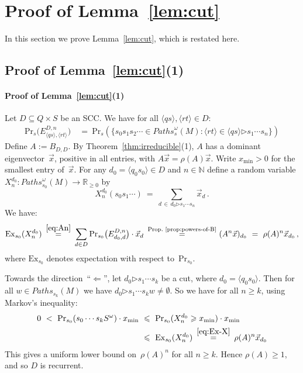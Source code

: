 \documentclass{elsarticle}
\def\<{\langle}
\def\>{\rangle}
\def\Nat{\mathbb{N}}
\def\Real{\mathbb{R}}
\def\Pr{\mathrm{Pr}}
\def\Paths{\mathit{Paths}}
\newcommand{\Ex}{\mathrm{Ex}}
\newcommand{\then}{\mathord{\triangleright}}
\begin{document}
\section{Proof of Lemma~\ref{lem:cut}} \label{sec:cut-proof}
In this section we prove Lemma~\ref{lem:cut}, which is restated here.

\lemcut*

\subsection{Proof of Lemma~\ref{lem:cut}(1)}
\paragraph{Proof of Lemma~\ref{lem:cut}(1)}
Let $D \subseteq Q \times S$ be an SCC.
We have for all $\<q s\>, \<r t\> \in D$:
\begin{equation} \label{eq:An}
\begin{aligned}
\Pr_{s}\big(E^{D,n}_{\<q s\>, \<r t\>}\big) &\ = \ \Pr_{s}(\{s_0 s_1 s_2 \cdots \in \Paths^\omega_{s}(M): \<r t\> \in \<q s\> \then s_1 \cdots s_n\})
\end{aligned}
\end{equation}
Define $A := B_{D,D}$.
By Theorem~\ref{thm:irreducible}(1), $A$ has a dominant
eigenvector~$\vec{x}$, positive in all entries, with $A \vec{x} =
\rho(A) \vec{x}$.  Write $x_{\min} > 0$ for the smallest entry
of~$\vec{x}$.  For any $d_0 = \<q_0 s_0\> \in D$ and $n \in \Nat$
define a random variable $X^{d_0}_n : \Paths^\omega_{s_0}(M) \to
\Real_{\geqslant 0}$ by
\[
X^{d_0}_n(s_0 s_1 \cdots) \ = \ \sum_{d \,\in\, d_0 \then s_1 \cdots s_n} \vec{x}_{d}\,.
\]
We have:
\begin{equation} \label{eq:Ex-X}
\Ex_{s_0}(X^{d_0}_n) \ \mathop{=}^{\eqref{eq:An}} \ \sum_{d \in D} \Pr_{s_0}\big(E^{D,n}_{d_0,d}\big) \cdot \vec{x}_d \ \mathop{=}^\text{Prop.~\ref{prop:powers-of-B}} \ (A^n \vec{x})_{d_0} \ = \ \rho(A)^n \vec{x}_{d_0}\,,
\end{equation}
where $\Ex_{s_0}$ denotes expectation with respect to~$\Pr_{s_0}$.

Towards the direction~``$\Longleftarrow$'', let $d_0 \then s_1 \cdots s_k$ be a cut, where $d_0 = \<q_0 s_0\>$.
Then for all $w \in \Paths_{s_k}(M)$ we have $d_0 \then s_1 \cdots s_k w \ne \emptyset$.
So we have for all $n \geqslant k$, using Markov's inequality:
\begin{align*}
0 \ < \ \Pr_{s_0}(s_0 \cdots s_k S^\omega) \cdot x_{\min} &\ \leqslant \ \Pr_{s_0}(X^{d_0}_n \geqslant x_{\min}) \cdot x_{\min} \\
&\ \leqslant \ \Ex_{s_0}(X^{d_0}_n) \ \mathop{=}^{\eqref{eq:Ex-X}} \ \rho(A)^n \vec{x}_{d_0}
\end{align*}
This gives a uniform lower bound on~$\rho(A)^n$ for all $n \geqslant k$.
Hence $\rho(A) \geqslant 1$, and so $D$ is recurrent.
\end{document}
